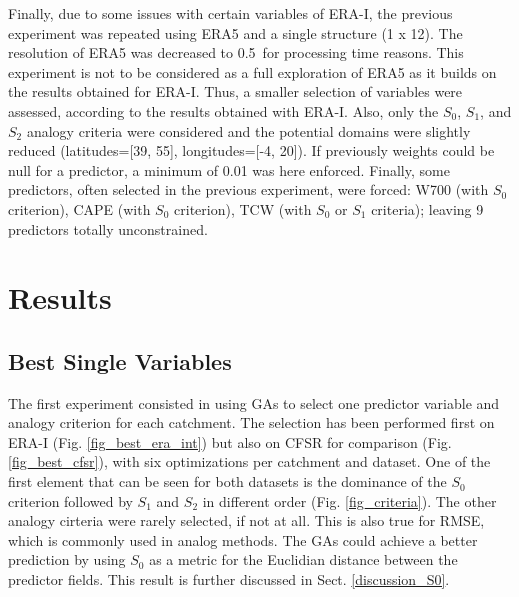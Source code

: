 \documentclass[draft]{agujournal2019}
\begin{document}
\begin{enumerate}
	Finally, due to some issues with certain variables of ERA-I, the previous experiment was repeated using ERA5 and a single structure (1 x 12). The resolution of ERA5 was decreased to 0.5\degree\ for processing time reasons. This experiment is not to be considered as a full exploration of ERA5 as it builds on the results obtained for ERA-I. Thus, a smaller selection of variables were assessed, according to the results obtained with ERA-I. Also, only the $S_{0}$, $S_{1}$, and $S_{2}$ analogy criteria were considered and the potential domains were slightly reduced (latitudes=[39, 55], longitudes=[-4, 20]). If previously weights could be null for a predictor, a minimum of 0.01 was here enforced. Finally, some predictors, often selected in the previous experiment, were forced: W700 (with $S_{0}$ criterion), CAPE (with $S_{0}$ criterion), TCW (with $S_{0}$ or $S_{1}$ criteria); leaving 9 predictors totally unconstrained.
\end{enumerate}


\section{Results}
\label{results}

\subsection{Best Single Variables}
\label{best_single}

The first experiment consisted in using GAs to select one predictor variable and analogy criterion for each catchment. The selection has been performed first on ERA-I (Fig. \ref{fig_best_era_int}) but also on CFSR for comparison (Fig. \ref{fig_best_cfsr}), with six optimizations per catchment and dataset. One of the first element that can be seen for both datasets is the dominance of the $S_{0}$ criterion followed by $S_{1}$ and $S_{2}$ in different order (Fig. \ref{fig_criteria}). The other analogy cirteria were rarely selected, if not at all. This is also true for RMSE, which is commonly used in analog methods. The GAs could achieve a better prediction by using $S_{0}$ as a metric for the Euclidian distance between the predictor fields. This result is further discussed in Sect. \ref{discussion_S0}.
\end{document}
